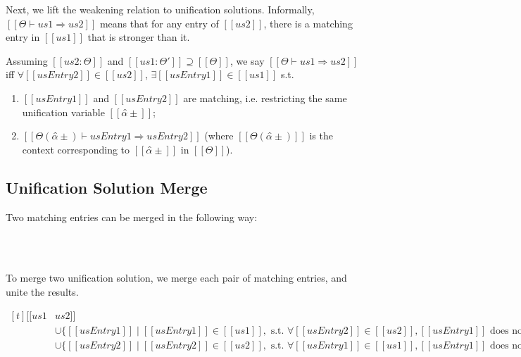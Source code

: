 \documentclass[a4,natbib=false]{article}
\begin{document}
Next, we lift the weakening relation to unification solutions.
Informally, $[[Θ ⊢ us1 ⇒ us2]]$ means that for any entry of $[[us2]]$,
there is a matching entry in $[[us1]]$ that is stronger than it. 

\begin{definition}
  Assuming $[[us2 : Θ]]$ and $[[us1 : Θ']] \supseteq [[Θ]]$,
  we say $[[Θ ⊢ us1 ⇒ us2]]$ iff
  $\forall [[usEntry2]] \in [[us2]]$, $\exists [[usEntry1]] \in [[us1]]$ s.t.
  \begin{enumerate}
    \item $[[usEntry1]]$ and $[[usEntry2]]$ are matching, i.e. restricting the same unification variable $[[α̂±]]$;
    \item $[[Θ(α̂±) ⊢ usEntry1 ⇒ usEntry2]]$ (where $[[Θ(α̂±)]]$ is the context corresponding to $[[α̂±]]$ in $[[Θ]]$).
  \end{enumerate}
\end{definition}


\subsection{Unification Solution Merge}

Two matching entries can be merged in the following way:
\begin{definition} \hfill \\
\ottdefnSME\\
\end{definition}


To merge two unification solution, we merge each pair of
matching entries, and unite the results.

\begin{definition}
  $\begin{aligned}[t]
  [[us1 & us2]] &= \{ [[usEntry1 & usEntry2]] \mid [[usEntry1]] \in [[us1]],
  [[usEntry2]]  \in [[us2]], \text{s.t. } [[usEntry1]] \text{ matches with }
                                   [[usEntry2]] \}\\
                &\cup
                                     \{ [[usEntry1]] \mid [[usEntry1]] \in
                                     [[us1]], \text{ s.t. }
                                     \forall [[usEntry2]]  \in [[us2]],
                                     [[usEntry1]] \text{ does not match with }
                                                     [[usEntry2]] \}\\
        &\cup
          \{ [[usEntry2]] \mid [[usEntry2]] \in
          [[us2]], \text{ s.t. }
          \forall [[usEntry1]]  \in [[us1]],
          [[usEntry1]] \text{ does not match with }
          [[usEntry2]] \}\\
   \end{aligned}$
\end{definition}
\end{document}
